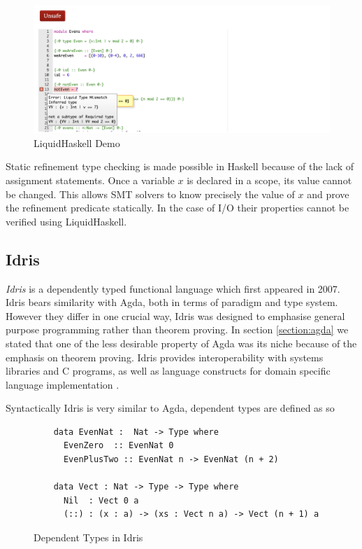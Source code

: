 \documentclass[a4paper,12pt]{report}
\begin{document}
\begin{figure}[H] 
  \begin{center}
    \includegraphics[scale=0.5]{assets/lh_demo_sm.PNG}
  \end{center}
  \caption{LiquidHaskell Demo}
  \label{fig:lh_demo}
\end{figure}

\par
Static refinement type checking is made possible in Haskell because of the lack 
of assignment statements. Once a variable $x$ is declared in a scope, its value 
cannot be changed. This allows SMT solvers to know precisely the value of $x$ 
and prove the refinement predicate statically. In the case of I/O 
their properties cannot be verified using LiquidHaskell.

\subsection{Idris}
\textit{Idris} \cite{idris} is a dependently typed functional language which first 
appeared in 2007. Idris bears similarity with Agda, both in terms of paradigm 
and type system. However they differ in one crucial way, Idris was designed to 
emphasise general purpose programming rather than theorem proving. In section 
\ref{section:agda} we stated that one of the less desirable property of 
Agda was its niche because of the emphasis on theorem proving. Idris provides 
interoperability with systems libraries and C programs, 
as well as language constructs for domain specific language 
implementation \cite{gpIdris}. 

\par
Syntactically Idris is very similar to Agda, dependent types are defined as so 
 
\begin{figure}[H]
  \begin{lstlisting}      
    data EvenNat :  Nat -> Type where
      EvenZero  :: EvenNat 0
      EvenPlusTwo :: EvenNat n -> EvenNat (n + 2)
      
    data Vect : Nat -> Type -> Type where
      Nil  : Vect 0 a
      (::) : (x : a) -> (xs : Vect n a) -> Vect (n + 1) a
  \end{lstlisting}
  \caption{Dependent Types in Idris}
\end{figure}
\end{document}
